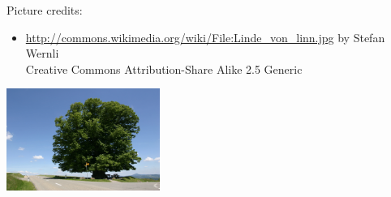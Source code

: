 \documentclass{beamer}
\begin{document}
\begin{frame}
  Picture credits:
  \begin{itemize}
  \item \url{http://commons.wikimedia.org/wiki/File:Linde_von_linn.jpg} by Stefan Wernli \\
     Creative Commons Attribution-Share Alike 2.5 Generic
  \end{itemize}

  \begin{center}
    \includegraphics[width=5cm]{Linde_von_linn.jpg}    
  \end{center}
\end{frame}
\end{document}
